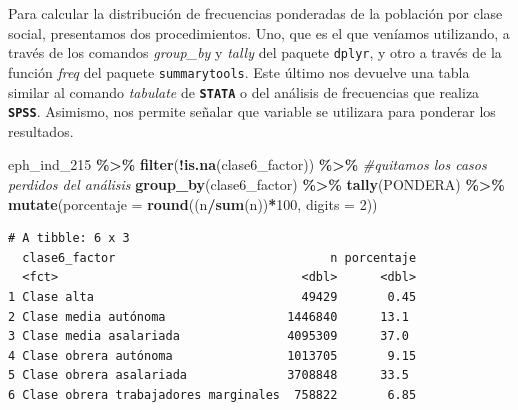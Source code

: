 \documentclass[
]{article}
\newenvironment{Shaded}{\begin{snugshade}}{\end{snugshade}}
\newcommand{\AttributeTok}[1]{\textcolor[rgb]{0.13,0.29,0.53}{#1}}
\newcommand{\CommentTok}[1]{\textcolor[rgb]{0.56,0.35,0.01}{\textit{#1}}}
\newcommand{\ConstantTok}[1]{\textcolor[rgb]{0.56,0.35,0.01}{#1}}
\newcommand{\DecValTok}[1]{\textcolor[rgb]{0.00,0.00,0.81}{#1}}
\newcommand{\FunctionTok}[1]{\textcolor[rgb]{0.13,0.29,0.53}{\textbf{#1}}}
\newcommand{\NormalTok}[1]{#1}
\newcommand{\SpecialCharTok}[1]{\textcolor[rgb]{0.81,0.36,0.00}{\textbf{#1}}}
\begin{document}
Para calcular la distribución de frecuencias ponderadas de la población por clase social, presentamos dos procedimientos. Uno, que es el que veníamos utilizando, a través de los comandos \emph{group\_by} y \emph{tally} del paquete \texttt{dplyr}, y otro a través de la función \emph{freq} del paquete \texttt{summarytools}. Este último nos devuelve una tabla similar al comando \emph{tabulate} de \textbf{\texttt{STATA}} o del análisis de frecuencias que realiza \textbf{\texttt{SPSS}}. Asimismo, nos permite señalar que variable se utilizara para ponderar los resultados.

\begin{Shaded}
\begin{Highlighting}[]
\NormalTok{eph\_ind\_215 }\SpecialCharTok{\%\textgreater{}\%}
    \FunctionTok{filter}\NormalTok{(}\SpecialCharTok{!}\FunctionTok{is.na}\NormalTok{(clase6\_factor)) }\SpecialCharTok{\%\textgreater{}\%} \CommentTok{\#quitamos los casos perdidos del análisis }
    \FunctionTok{group\_by}\NormalTok{(clase6\_factor) }\SpecialCharTok{\%\textgreater{}\%} 
    \FunctionTok{tally}\NormalTok{(PONDERA) }\SpecialCharTok{\%\textgreater{}\%} 
    \FunctionTok{mutate}\NormalTok{(}\AttributeTok{porcentaje =} \FunctionTok{round}\NormalTok{((n}\SpecialCharTok{/}\FunctionTok{sum}\NormalTok{(n))}\SpecialCharTok{*}\DecValTok{100}\NormalTok{, }\AttributeTok{digits =} \DecValTok{2}\NormalTok{))}
\end{Highlighting}
\end{Shaded}

\begin{verbatim}
# A tibble: 6 x 3
  clase6_factor                              n porcentaje
  <fct>                                  <dbl>      <dbl>
1 Clase alta                             49429       0.45
2 Clase media autónoma                 1446840      13.1 
3 Clase media asalariada               4095309      37.0 
4 Clase obrera autónoma                1013705       9.15
5 Clase obrera asalariada              3708848      33.5 
6 Clase obrera trabajadores marginales  758822       6.85
\end{verbatim}

\begin{Shaded}
\end{Shaded}
\end{document}
